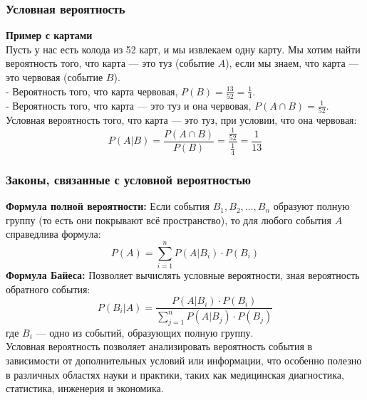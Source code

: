 \documentclass[aspectratio=169]{beamer}
\begin{document}
\begin{frame}
\frametitle{Условная вероятность}
\textbf{Пример с картами} 
\newline\\
Пусть у нас есть колода из 52 карт, и мы извлекаем одну карту. Мы хотим найти вероятность того, что карта — это туз (событие \( A \)), если мы знаем, что карта — это червовая (событие \( B \)).
\newline\\
- Вероятность того, что карта червовая, \( P(B) = \frac{13}{52} = \frac{1}{4} \).
\newline\\
- Вероятность того, что карта — это туз и она червовая, \( P(A \cap B) = \frac{1}{52} \).
\newline\\
Условная вероятность того, что карта — это туз, при условии, что она червовая:
   \[
   P(A | B) = \frac{P(A \cap B)}{P(B)} = \frac{\frac{1}{52}}{\frac{1}{4}} = \frac{1}{13}
   \]
\end{frame}

\begin{frame}
\frametitle{Законы, связанные с условной вероятностью}
\textbf{Формула полной вероятности:} Если события \( B_1, B_2, \ldots, B_n \) образуют полную группу (то есть они покрывают всё пространство), то для любого события \( A \) справедлива формула:
   \[
   P(A) = \sum_{i=1}^{n} P(A | B_i) \cdot P(B_i)
   \]
\textbf{Формула Байеса:} Позволяет вычислять условные вероятности, зная вероятность обратного события:
   \[
   P(B_i | A) = \frac{P(A | B_i) \cdot P(B_i)}{\sum_{j=1}^{n} P(A | B_j) \cdot P(B_j)}
   \]
где \( B_i \) — одно из событий, образующих полную группу.
\newline\\
Условная вероятность позволяет анализировать вероятность события в зависимости от дополнительных условий или информации, что особенно полезно в различных областях науки и практики, таких как медицинская диагностика, статистика, инженерия и экономика.
\end{frame}
\end{document}
